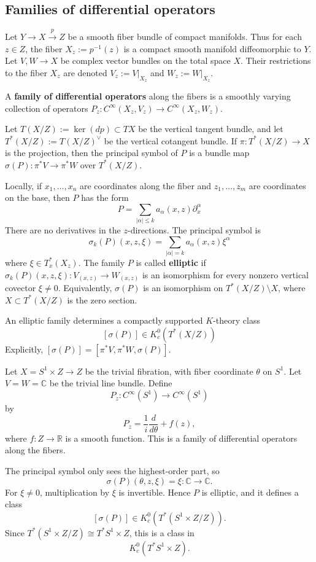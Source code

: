 \documentclass[12pt]{article}
\begin{document}
\subsection{Families of differential operators}

Let $Y\to X\xrightarrow{p} Z$ be a smooth fiber bundle of compact manifolds. Thus for each $z\in Z$, the fiber $X_z:=p^{-1}(z)$ is a compact smooth manifold diffeomorphic to $Y$. Let $V,W\to X$ be complex vector bundles on the total space $X$. Their restrictions to the fiber $X_z$ are denoted $V_z:=V|_{X_z}$ and $W_z:=W|_{X_z}$.

\begin{definition}
    A \textbf{family of differential operators} along the fibers is a smoothly varying collection of operators $P_z:C^\infty(X_z,V_z)\to C^\infty(X_z,W_z)$. 
\end{definition}

Let $T(X/Z):=\ker(dp)\subset TX$ be the vertical tangent bundle, and let $T^*(X/Z):=T(X/Z)^\vee$ be the vertical cotangent bundle. If $\pi:T^*(X/Z)\to X$ is the projection, then the principal symbol of $P$ is a bundle map $\sigma(P):\pi^*V\to \pi^*W$ over $T^*(X/Z)$.

Locally, if $x_1,\dots,x_n$ are coordinates along the fiber and $z_1,\dots,z_m$ are coordinates on the base, then $P$ has the form \[P=\sum_{|\alpha|\le k}a_\alpha(x,z)\partial_x^\alpha\] There are no derivatives in the $z$-directions. The principal symbol is \[\sigma_k(P)(x,z,\xi)=\sum_{|\alpha|=k}a_\alpha(x,z)\xi^\alpha\] where $\xi\in T_x^*(X_z)$. The family $P$ is called \textbf{elliptic} if $\sigma_k(P)(x,z,\xi):V_{(x,z)}\to W_{(x,z)}$ is an isomorphism for every nonzero vertical covector $\xi\neq 0$. Equivalently, $\sigma(P)$ is an isomorphism on $T^*(X/Z)\setminus X$, where $X\subset T^*(X/Z)$ is the zero section.

\begin{proposition}
    An elliptic family determines a compactly supported $K$-theory class \[[\sigma(P)]\in K_c^0(T^*(X/Z))\] Explicitly, $[\sigma(P)]=[\pi^*V,\pi^*W,\sigma(P)]$.
\end{proposition}

\begin{example}
Let $X=S^1\times Z\to Z$ be the trivial fibration, with fiber coordinate $\theta$ on $S^1$. Let $V=W=\mathbb C$ be the trivial line bundle. Define
\[
P_z:C^\infty(S^1)\to C^\infty(S^1)
\]
by
\[
P_z=\frac{1}{i}\frac{d}{d\theta}+f(z),
\]
where $f:Z\to \mathbb R$ is a smooth function. This is a family of differential operators along the fibers.

The principal symbol only sees the highest-order part, so
\[
\sigma(P)(\theta,z,\xi)=\xi:\mathbb C\to \mathbb C.
\]
For $\xi\neq 0$, multiplication by $\xi$ is invertible. Hence $P$ is elliptic, and it defines a class
\[
[\sigma(P)]\in K_c^0(T^*(S^1\times Z/Z)).
\]
Since $T^*(S^1\times Z/Z)\cong T^*S^1\times Z$, this is a class in
\[
K_c^0(T^*S^1\times Z).
\]
\end{example}
\end{document}
